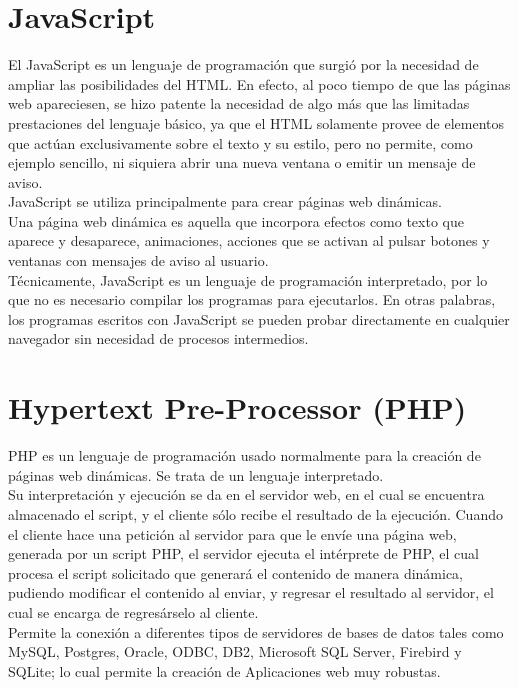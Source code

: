 \section{JavaScript}
El JavaScript es un lenguaje de programaci\'on que surgi\'o por la necesidad de ampliar las posibilidades del HTML. En efecto, al poco tiempo de que las p\'aginas web apareciesen, se hizo patente la necesidad de algo m\'as que las limitadas prestaciones del lenguaje b\'asico, ya que el HTML solamente provee de elementos que act\'uan exclusivamente sobre el texto y su estilo, pero no permite, como ejemplo sencillo, ni siquiera abrir una nueva ventana o emitir un mensaje de aviso.\\

JavaScript  se utiliza principalmente para crear p\'aginas web din\'amicas.\\

Una p\'agina web din\'amica es aquella que incorpora efectos como texto que aparece y desaparece, animaciones, acciones que se activan al pulsar botones y ventanas con mensajes de aviso al usuario.\\

T\'ecnicamente, JavaScript es un lenguaje de programaci\'on interpretado, por lo que no es necesario compilar los programas para ejecutarlos. En otras palabras, los programas escritos con JavaScript se pueden probar directamente en cualquier navegador sin necesidad de procesos intermedios. \cite{js}

\section{Hypertext Pre-Processor (PHP)}
PHP es un lenguaje de programaci\'on usado normalmente para la creaci\'on de p\'aginas web din\'amicas. Se trata de un lenguaje interpretado.\\

Su interpretaci\'on y ejecuci\'on se da en el servidor web, en el cual se encuentra almacenado el script, y el cliente s\'olo recibe el resultado de la ejecuci\'on. Cuando el cliente hace una petici\'on al servidor para que le env\'ie una p\'agina web, generada por un script PHP, el servidor ejecuta el int\'erprete de PHP, el cual procesa el script solicitado que generar\'a el contenido de manera din\'amica, pudiendo modificar el contenido al enviar, y regresar el resultado al servidor, el cual se encarga de regres\'arselo al cliente.\\

Permite la conexi\'on a diferentes tipos de servidores de bases de datos tales como MySQL, Postgres, Oracle, ODBC, DB2, Microsoft SQL Server, Firebird y SQLite; lo cual permite la creaci\'on de Aplicaciones web muy robustas.\\


